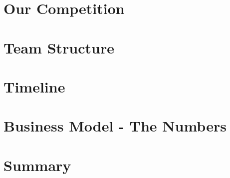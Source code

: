 \documentclass[a4paper, 11pt]{report}
\begin{document}
	{
		\FloatBarrier
		\chapter{Our Competition}
		\label{chp:competition}
		
	}

	{
		\FloatBarrier
		\chapter{Team Structure}
		\label{chp:team_structure}
		
	}

	{
		\FloatBarrier
		\chapter{Timeline}
		\label{chp:timeline}
		
	}

	{
		\FloatBarrier
		\chapter{Business Model - The Numbers}
		\label{chp:business_model}
		
	}

	{
		\FloatBarrier
		\chapter{Summary}
		\label{chp:summary}
		
	}

	{
		\FloatBarrier
		\newpage
		\printbibliography[title = References]
	}
\end{document}
